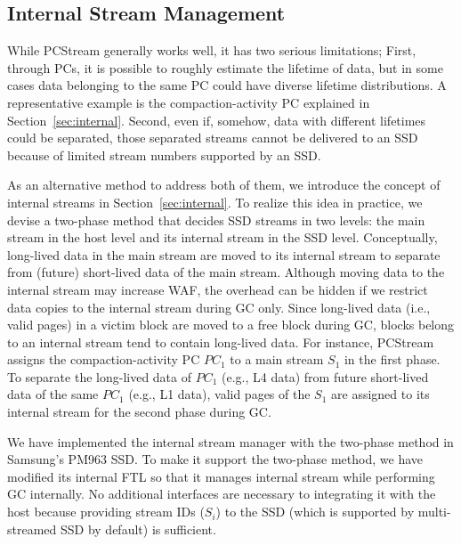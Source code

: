 \subsection{Internal Stream Management}
While \textsf{PCStream} generally works well, it has two serious limitations;
First, through PCs, it is possible to roughly estimate the lifetime of data,
but in some cases data belonging to the same PC could have diverse lifetime
distributions.  A representative example is the compaction-activity PC
explained in Section~\ref{sec:internal}. Second, even if, somehow, data with different lifetimes
could be separated, those separated streams cannot be delivered to an SSD
because of limited stream numbers supported by an SSD.

As an alternative method to address both of them, we introduce the concept of
internal streams in Section~\ref{sec:internal}. To realize this idea in practice, we devise a
two-phase method that decides SSD streams in two levels: the main stream in the
host level and its internal stream in the SSD level.  Conceptually, long-lived
data in the main stream are moved to its internal stream to separate from
(future) short-lived data of the main stream.  Although moving data to the
internal stream may increase WAF, the overhead can be hidden if we restrict
data copies to the internal stream during GC only.  Since long-lived data
(i.e., valid pages) in a victim block are moved to a free block during GC,
blocks belong to an internal stream tend to contain long-lived data.  For
instance, \textsf{\small PCStream} assigns the compaction-activity PC {\it
$PC_1$} to a main stream {\it $S_1$} in the first phase.  To separate the
long-lived data of {\it $PC_1$} (e.g., L4 data) from future short-lived data of
the same {\it $PC_1$} (e.g., L1 data), valid pages of the {\it $S_1$} are
assigned to its internal stream for the second phase during GC.

We have implemented the internal stream manager with the two-phase method in
Samsung's PM963 SSD. To make it support the two-phase method, we
have modified its internal FTL so that it manages internal stream while
performing GC internally. No additional interfaces are necessary to integrating
it with the host because providing stream IDs (\textit{$S_i$}) to the SSD (which
is supported by multi-streamed SSD by default) is sufficient.



